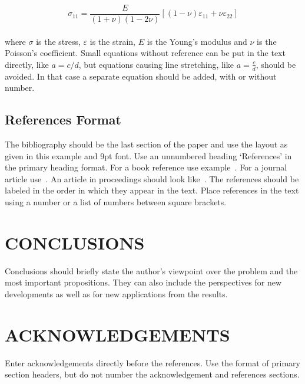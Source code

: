 \documentclass[]{YIC2015}
\begin{document}
\begin{equation}
\label{eq:hooke}
   \sigma_{11} = \frac{E}{(1+\nu)(1-2\nu)}
                 \left[(1-\nu)\varepsilon_{11}+\nu\varepsilon_{22}\right]
\end{equation}
\\
where $\sigma$ is the stress, $\varepsilon$ is the strain, $E$ is the Young's modulus and $\nu$ is the Poisson's coefficient. Small equations without reference can be put in the text directly, like $a = c/d$, but equations causing line stretching, like $\displaystyle a=\frac{c}{d}$, should be avoided. In that case a separate equation should be added, with or without number.

\subsection{References Format}
The bibliography should be the last section of the paper and use the layout as given in this example and 9pt font. Use an unnumbered heading `References' in the primary heading format. For a book reference use example~\cite{bookref}.  For a journal article use~\cite{articleref}. An article in proceedings should look like~\cite{procref}. The references should be labeled in the order in which they appear in the text. Place references in the text using a number or a list of numbers between square brackets.

\section{CONCLUSIONS}
Conclusions should briefly state the author's viewpoint over the problem and the most important propositions. They can also include the perspectives for new developments as well as for new applications from the results.

\section*{ACKNOWLEDGEMENTS}
Enter acknowledgements directly before the references. Use the format of primary section headers, but do not number the acknowledgement and references sections.
\end{document}
